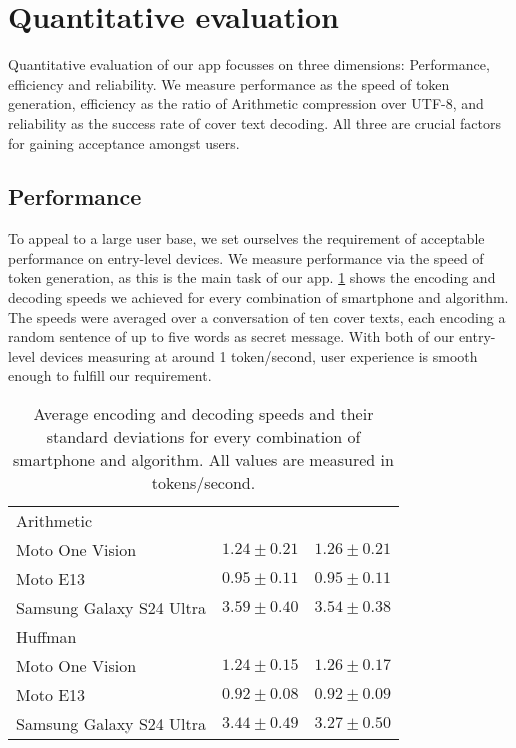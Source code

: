 \section{Quantitative evaluation}
\label{sec:quantitativeEvaluation}
Quantitative evaluation of our app focusses on three dimensions: Performance, efficiency and reliability. We measure performance as the speed of token generation, efficiency as the ratio of Arithmetic compression over UTF-8, and reliability as the success rate of cover text decoding. All three are crucial factors for gaining acceptance amongst users.

\subsection{Performance}
\label{sec:performance}
To appeal to a large user base, we set ourselves the requirement of acceptable performance on entry-level devices. We measure performance via the speed of token generation, as this is the main task of our app. \cref{tab:performance} shows the encoding and decoding speeds we achieved for every combination of smartphone and algorithm. The speeds were averaged over a conversation of ten cover texts, each encoding a random sentence of up to five words as secret message. With both of our entry-level devices measuring at around 1 token/second, user experience is smooth enough to fulfill our requirement.

\begin{table}
	\centering
	\begin{tabular}{@{} lrr @{}} %
		\toprule
		\tableheadline{Device} & \tableheadline{Encoding} & \tableheadline{Decoding} \\
		\midrule
        Arithmetic               &                 &                 \\
		\midrule
        Moto One Vision          & $1.24 \pm 0.21$ & $1.26 \pm 0.21$ \\
		Moto E13                 & $0.95 \pm 0.11$ & $0.95 \pm 0.11$ \\
        Samsung Galaxy S24 Ultra & $3.59 \pm 0.40$ & $3.54 \pm 0.38$ \\
        \midrule
        Huffman                  &                 &                 \\
        \midrule
        Moto One Vision          & $1.24 \pm 0.15$ & $1.26 \pm 0.17$ \\
		Moto E13                 & $0.92 \pm 0.08$ & $0.92 \pm 0.09$ \\
        Samsung Galaxy S24 Ultra & $3.44 \pm 0.49$ & $3.27 \pm 0.50$ \\
		\bottomrule
	\end{tabular}
	\caption[Performance measurements]{Average encoding and decoding speeds and their standard deviations for every combination of smartphone and algorithm. All values are measured in tokens/second.}
	\label{tab:performance}
\end{table}

